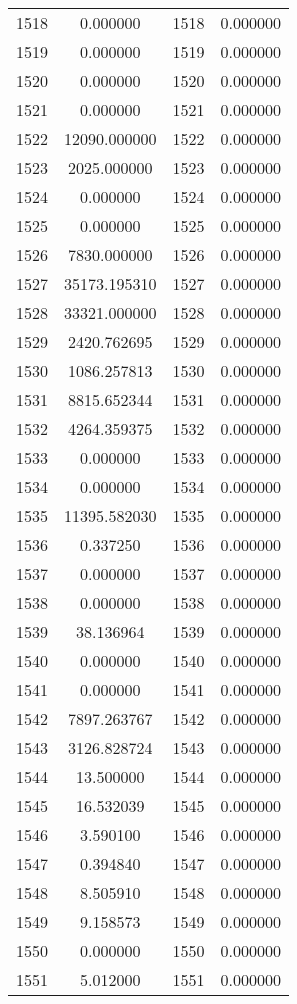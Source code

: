 \documentclass[12pt]{article}
\begin{document}
\begin{longtable}{@{}cccc@{}}
1518 & 0.000000 & 1518 & 0.000000 \\
1519 & 0.000000 & 1519 & 0.000000 \\
1520 & 0.000000 & 1520 & 0.000000 \\
1521 & 0.000000 & 1521 & 0.000000 \\
1522 & 12090.000000 & 1522 & 0.000000 \\
1523 & 2025.000000 & 1523 & 0.000000 \\
1524 & 0.000000 & 1524 & 0.000000 \\
1525 & 0.000000 & 1525 & 0.000000 \\
1526 & 7830.000000 & 1526 & 0.000000 \\
1527 & 35173.195310 & 1527 & 0.000000 \\
1528 & 33321.000000 & 1528 & 0.000000 \\
1529 & 2420.762695 & 1529 & 0.000000 \\
1530 & 1086.257813 & 1530 & 0.000000 \\
1531 & 8815.652344 & 1531 & 0.000000 \\
1532 & 4264.359375 & 1532 & 0.000000 \\
1533 & 0.000000 & 1533 & 0.000000 \\
1534 & 0.000000 & 1534 & 0.000000 \\
1535 & 11395.582030 & 1535 & 0.000000 \\
1536 & 0.337250 & 1536 & 0.000000 \\
1537 & 0.000000 & 1537 & 0.000000 \\
1538 & 0.000000 & 1538 & 0.000000 \\
1539 & 38.136964 & 1539 & 0.000000 \\
1540 & 0.000000 & 1540 & 0.000000 \\
1541 & 0.000000 & 1541 & 0.000000 \\
1542 & 7897.263767 & 1542 & 0.000000 \\
1543 & 3126.828724 & 1543 & 0.000000 \\
1544 & 13.500000 & 1544 & 0.000000 \\
1545 & 16.532039 & 1545 & 0.000000 \\
1546 & 3.590100 & 1546 & 0.000000 \\
1547 & 0.394840 & 1547 & 0.000000 \\
1548 & 8.505910 & 1548 & 0.000000 \\
1549 & 9.158573 & 1549 & 0.000000 \\
1550 & 0.000000 & 1550 & 0.000000 \\
1551 & 5.012000 & 1551 & 0.000000 \\

\end{longtable}
\end{document}
